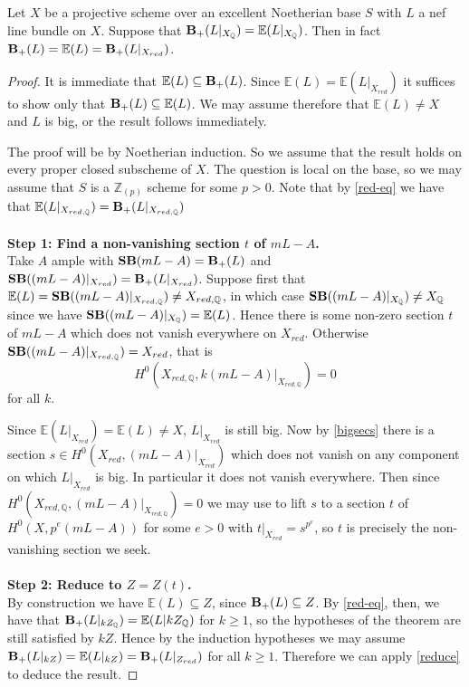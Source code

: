\begin{theorem}\label{ext}
	
	Let $X$ be a projective scheme over an excellent Noetherian base $S$ with $L$ a nef line bundle on $X$. Suppose that $\mathbf{B}_{+}(L|_{X_{\mathbb{Q}}})=\mathbb{E}(L|_{X_{\mathbb{Q}}})$. Then in fact $\mathbf{B}_{+}(L)=\mathbb{E}(L)=\mathbf{B}_{+}(L|_{X_{red}})$.
	
\end{theorem}

\begin{proof}
	
	It is immediate that $\mathbb{E}(L)\subseteq \mathbf{B}_{+}(L)$. Since $\mathbb{E}(L)=\mathbb{E}(L|_{X_{red}})$ it suffices to show only that $\mathbf{B}_{+}(L) \subseteq \mathbb{E}(L)$. We may assume therefore that $\mathbb{E}(L) \neq X$ and $L$  is big, or the result follows immediately.
	
	The proof will be by Noetherian induction. So we assume that the result holds on every proper closed subscheme of $X$. The question is local on the base, so we may assume that $S$ is a $\mathbb{Z}_{(p)}$ scheme for some $p > 0$. Note that by \autoref{red-eq} we have that $\mathbb{E}(L|_{X_{red,\mathbb{Q}}})=\mathbf{B}_{+}(L|_{X_{red,\mathbb{Q}}})$\\
	\\
	\textbf{Step 1: Find a non-vanishing section $t$ of $mL-A$.}\\
	
	Take $A$ ample with $\mathbf{SB}(mL-A)=\mathbf{B}_{+}(L)$ and $\mathbf{SB}((mL-A)|_{X_{red}})=\mathbf{B}_{+}(L|_{X_{red}})$. Suppose first that $\mathbb{E}(L)=\mathbf{SB}((mL-A)|_{X_{red,\mathbb{Q}}}) \neq X_{red,\mathbb{Q}}$, in which case $\mathbf{SB}((mL-A)|_{X_{\mathbb{Q}}}) \neq X_{\mathbb{Q}}$ since we have $\mathbf{SB}((mL-A)|_{X_{\mathbb{Q}}})=\mathbb{E}(L)$. Hence there is some non-zero section $t$ of $mL-A$ which does not vanish everywhere on $X_{red}$. Otherwise $\mathbf{SB}((mL-A)|_{X_{red,\mathbb{Q}}}) = X_{red}$, that is $$H^{0}(X_{red,\mathbb{Q}},k(mL-A)|_{X_{red,\mathbb{Q}}}) =0$$ for all $k$. 
	
	Since $\mathbb{E}(L|_{X_{red}})=\mathbb{E}(L) \neq X$, $L|_{X_{red}}$ is still big. Now by \autoref{bigsecs} there is a section $s\in H^{0}(X_{red},(mL-A)|_{X_{red}})$ which does not vanish on any component on which $L|_{X_{red}}$ is big. In particular it does not vanish everywhere. Then since $H^{0}(X_{red,\mathbb{Q}},(mL-A)|_{X_{red,\mathbb{Q}}}) =0$ we may use \cite[Proposition 3.5]{witaszek2020keels} to lift $s$ to a section $t$ of $H^{0}(X,p^{e}(mL-A))$ for some $e > 0$ with $t|_{X_{red}}=s^{p^{e}}$, so $t$ is precisely the non-vanishing section we seek.\\
	\\
	\textbf{Step 2: Reduce to $Z=Z(t)$.}\\
	
	By construction we have $\mathbb{E}(L)\subseteq Z$, since $\mathbf{B}_{+}(L) \subseteq Z$. By \autoref{red-eq}, then, we have that $\mathbf{B}_{+}(L|_{kZ_{\mathbb{Q}}})=\mathbb{E}(L|{kZ_{\mathbb{Q}}})$ for $k \geq 1$, so the hypotheses of the theorem are still satisfied by $kZ$. Hence by the induction hypotheses we may assume $\mathbf{B}_{+}(L|_{kZ})=\mathbb{E}(L|_{kZ})=\mathbf{B}_{+}(L|_{Z_{red}})$ for all $k \geq 1$. Therefore we can apply \autoref{reduce} to deduce the result.
\end{proof}

